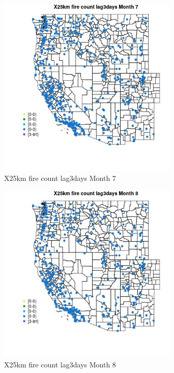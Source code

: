 \begin{figure} 
\centering  
\includegraphics[width=0.77\textwidth]{Code_Outputs/Report_ML_input_PM25_Step4_part_e_de_duplicated_aves_compiled_2019-05-14wNAs_MapObsMo7X25km_fire_count_lag3days.jpg} 
\caption{\label{fig:Report_ML_input_PM25_Step4_part_e_de_duplicated_aves_compiled_2019-05-14wNAsMapObsMo7X25km_fire_count_lag3days}X25km fire count lag3days Month 7} 
\end{figure} 
 

\begin{figure} 
\centering  
\includegraphics[width=0.77\textwidth]{Code_Outputs/Report_ML_input_PM25_Step4_part_e_de_duplicated_aves_compiled_2019-05-14wNAs_MapObsMo8X25km_fire_count_lag3days.jpg} 
\caption{\label{fig:Report_ML_input_PM25_Step4_part_e_de_duplicated_aves_compiled_2019-05-14wNAsMapObsMo8X25km_fire_count_lag3days}X25km fire count lag3days Month 8} 
\end{figure} 
 

